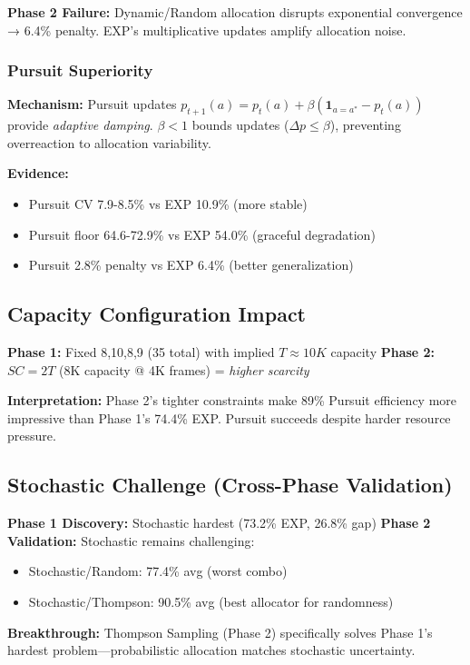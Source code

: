 \documentclass[11pt,a4paper]{article}
\begin{document}
\textbf{Phase 2 Failure:} Dynamic/Random allocation disrupts exponential convergence → 6.4\% penalty. EXP's multiplicative updates amplify allocation noise.

\subsubsection{Pursuit Superiority}

\textbf{Mechanism:} Pursuit updates $p_{t+1}(a) = p_t(a) + \beta(\mathbf{1}_{a=a^*} - p_t(a))$ provide \textit{adaptive damping}. $\beta < 1$ bounds updates ($\Delta p \leq \beta$), preventing overreaction to allocation variability.

\textbf{Evidence:}
\begin{itemize}
\item Pursuit CV 7.9-8.5\% vs EXP 10.9\% (more stable)
\item Pursuit floor 64.6-72.9\% vs EXP 54.0\% (graceful degradation)
\item Pursuit 2.8\% penalty vs EXP 6.4\% (better generalization)
\end{itemize}

\subsection{Capacity Configuration Impact}

\textbf{Phase 1:} Fixed 8,10,8,9 (35 total) with implied $T \approx 10K$ capacity
\textbf{Phase 2:} $SC = 2T$ (8K capacity @ 4K frames) = \textit{higher scarcity}

\textbf{Interpretation:} Phase 2's tighter constraints make 89\% Pursuit efficiency more impressive than Phase 1's 74.4\% EXP. Pursuit succeeds despite harder resource pressure.

\subsection{Stochastic Challenge (Cross-Phase Validation)}

\textbf{Phase 1 Discovery:} Stochastic hardest (73.2\% EXP, 26.8\% gap)
\textbf{Phase 2 Validation:} Stochastic remains challenging:
\begin{itemize}
\item Stochastic/Random: 77.4\% avg (worst combo)
\item Stochastic/Thompson: 90.5\% avg (best allocator for randomness)
\end{itemize}

\textbf{Breakthrough:} Thompson Sampling (Phase 2) specifically solves Phase 1's hardest problem—probabilistic allocation matches stochastic uncertainty.
\end{document}
